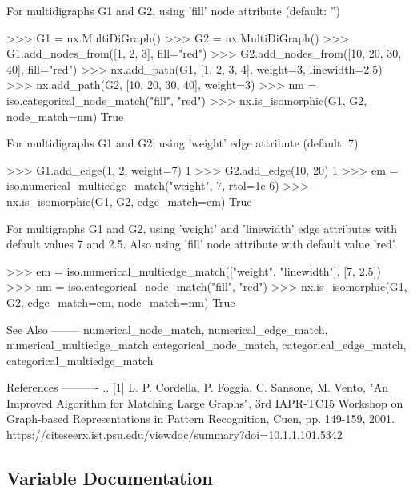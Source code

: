 \begin{DoxyVerb}
For multidigraphs G1 and G2, using 'fill' node attribute (default: '')

>>> G1 = nx.MultiDiGraph()
>>> G2 = nx.MultiDiGraph()
>>> G1.add_nodes_from([1, 2, 3], fill="red")
>>> G2.add_nodes_from([10, 20, 30, 40], fill="red")
>>> nx.add_path(G1, [1, 2, 3, 4], weight=3, linewidth=2.5)
>>> nx.add_path(G2, [10, 20, 30, 40], weight=3)
>>> nm = iso.categorical_node_match("fill", "red")
>>> nx.is_isomorphic(G1, G2, node_match=nm)
True

For multidigraphs G1 and G2, using 'weight' edge attribute (default: 7)

>>> G1.add_edge(1, 2, weight=7)
1
>>> G2.add_edge(10, 20)
1
>>> em = iso.numerical_multiedge_match("weight", 7, rtol=1e-6)
>>> nx.is_isomorphic(G1, G2, edge_match=em)
True

For multigraphs G1 and G2, using 'weight' and 'linewidth' edge attributes
with default values 7 and 2.5. Also using 'fill' node attribute with
default value 'red'.

>>> em = iso.numerical_multiedge_match(["weight", "linewidth"], [7, 2.5])
>>> nm = iso.categorical_node_match("fill", "red")
>>> nx.is_isomorphic(G1, G2, edge_match=em, node_match=nm)
True

See Also
--------
numerical_node_match, numerical_edge_match, numerical_multiedge_match
categorical_node_match, categorical_edge_match, categorical_multiedge_match

References
----------
.. [1]  L. P. Cordella, P. Foggia, C. Sansone, M. Vento,
   "An Improved Algorithm for Matching Large Graphs",
   3rd IAPR-TC15 Workshop  on Graph-based Representations in
   Pattern Recognition, Cuen, pp. 149-159, 2001.
   https://citeseerx.ist.psu.edu/viewdoc/summary?doi=10.1.1.101.5342
\end{DoxyVerb}
 

\subsection{Variable Documentation}
\mbox{\label{namespacenetworkx_1_1algorithms_1_1isomorphism_1_1isomorph_a8eef774439e10f84cd06553330fa865b}} 
